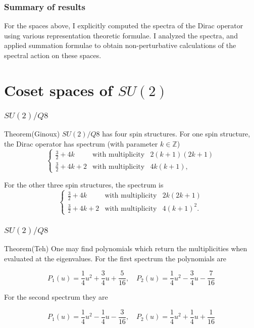 \documentclass{beamer}
\def\Z{{\mathbb Z}}
\begin{document}
\begin{frame}
	\frametitle{Summary of results}
For the spaces above, I explicitly computed the spectra of the Dirac operator using various representation theoretic formulae. I analyzed the spectra, and applied summation formulae to obtain non-perturbative calculations of the spectral action on these spaces.
\end{frame}

\section{Coset spaces of $SU(2)$}

\begin{frame}
	\frametitle{$SU(2)/Q8$}
	\begin{block}{Theorem(Ginoux)}
	$SU(2)/Q8$ has four spin structures. For one spin structure, the Dirac operator has spectrum (with parameter $k \in \Z$)
	\[
	\left\{ \begin{array}{lll}
\frac{3}{2} + 4k & \text{with multiplicity} & 2(k+1)(2k+1) \\[2mm]
\frac{3}{2} + 4k +2 & \text{with multiplicity} & 4k(k+1),
\end{array}\right.
	\]
	
	For the other three spin structures, the spectrum is
	\[
\left\{ \begin{array}{lll}
\frac{3}{2} + 4k & \text{with multiplicity} & 2k(2k+1) \\[2mm]
\frac{3}{2} + 4k +2 & \text{with multiplicity} & 4(k+1)^2.
\end{array}\right.
	\]
	\end{block}
\end{frame}

\begin{frame}
	\frametitle{$SU(2)/Q8$}
	\begin{block}{Theorem(Teh)}
		One may find polynomials which return the multiplicities when evaluated at the eigenvalues. For the first spectrum the polynomials are
		
		\[
P_1(u) =\frac{1}{4} u^2 + \frac{3}{4} u + \frac{5}{16}, \quad P_2(u) =  \frac{1}{4} u^2 - \frac{3}{4} u - \frac{7}{16}
		\]
		
		For the second spectrum they are
		
		\[
P_1(u)  = \frac{1}{4} u^2 - \frac{1}{4} u - \frac{3}{16}, \quad P_2(u)  = \frac{1}{4} u^2 + \frac{1}{4} u + \frac{1}{16}
		\]
	\end{block}
\end{frame}
\end{document}

